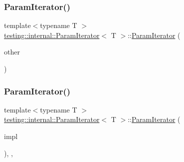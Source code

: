 \subsubsection{\texorpdfstring{ParamIterator()}{ParamIterator()}\hspace{0.1cm}{\footnotesize\ttfamily [3/6]}}
{\footnotesize\ttfamily template$<$typename T $>$ \\
\mbox{\hyperlink{classtesting_1_1internal_1_1_param_iterator}{testing\+::internal\+::\+Param\+Iterator}}$<$ T $>$\+::\mbox{\hyperlink{classtesting_1_1internal_1_1_param_iterator}{Param\+Iterator}} (\begin{DoxyParamCaption}\item[{const \mbox{\hyperlink{classtesting_1_1internal_1_1_param_iterator}{Param\+Iterator}}$<$ T $>$ \&}]{other }\end{DoxyParamCaption})\hspace{0.3cm}{\ttfamily [inline]}}

\mbox{\label{classtesting_1_1internal_1_1_param_iterator_acf5ad898e7f50eb82a6c367889aa07c4}} 
\subsubsection{\texorpdfstring{ParamIterator()}{ParamIterator()}\hspace{0.1cm}{\footnotesize\ttfamily [4/6]}}
{\footnotesize\ttfamily template$<$typename T $>$ \\
\mbox{\hyperlink{classtesting_1_1internal_1_1_param_iterator}{testing\+::internal\+::\+Param\+Iterator}}$<$ T $>$\+::\mbox{\hyperlink{classtesting_1_1internal_1_1_param_iterator}{Param\+Iterator}} (\begin{DoxyParamCaption}\item[{\mbox{\hyperlink{classtesting_1_1internal_1_1_param_iterator_interface}{Param\+Iterator\+Interface}}$<$ T $>$ $\ast$}]{impl }\end{DoxyParamCaption})\hspace{0.3cm}{\ttfamily [inline]}, {\ttfamily [explicit]}, {\ttfamily [private]}}

\mbox{\label{classtesting_1_1internal_1_1_param_iterator_aa10585055ee055e304703a3004f24f33}} 
